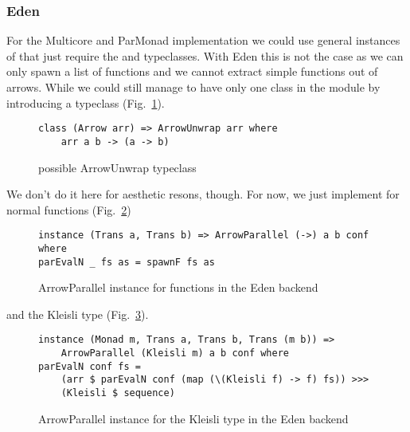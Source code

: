 \subsubsection{Eden}
For the Multicore and ParMonad implementation we could use general instances of  that just require the  and  typeclasses. With Eden this is not the case as we can only spawn a list of functions and we cannot extract simple functions out of arrows. While we could still manage to have only one class in the module by introducing a typeclass  (Fig.~\ref{fig:ArrowUnwrap}).
\begin{figure}[h]
\begin{lstlisting}[frame=htrbl]
class (Arrow arr) => ArrowUnwrap arr where
	arr a b -> (a -> b)
\end{lstlisting}
\caption{possible ArrowUnwrap typeclass}
\label{fig:ArrowUnwrap}
\end{figure}
We don't do it here for aesthetic resons, though. For now, we just implement  for normal functions (Fig.~\ref{fig:ArrowParallelEdenFns})
\begin{figure}[h]
\begin{lstlisting}[frame=htrbl]
instance (Trans a, Trans b) => ArrowParallel (->) a b conf where
parEvalN _ fs as = spawnF fs as
\end{lstlisting}
\caption{ArrowParallel instance for functions in the Eden backend}
\label{fig:ArrowParallelEdenFns}
\end{figure}
and the Kleisli type (Fig.~\ref{fig:ArrowParallelEdenKleisli}).
\begin{figure}[h]
\begin{lstlisting}[frame=htrbl]
instance (Monad m, Trans a, Trans b, Trans (m b)) =>
	ArrowParallel (Kleisli m) a b conf where
parEvalN conf fs =
	(arr $ parEvalN conf (map (\(Kleisli f) -> f) fs)) >>>
	(Kleisli $ sequence)
\end{lstlisting}
\caption{ArrowParallel instance for the Kleisli type in the Eden backend}
\label{fig:ArrowParallelEdenKleisli}
\end{figure}

\FloatBarrier

